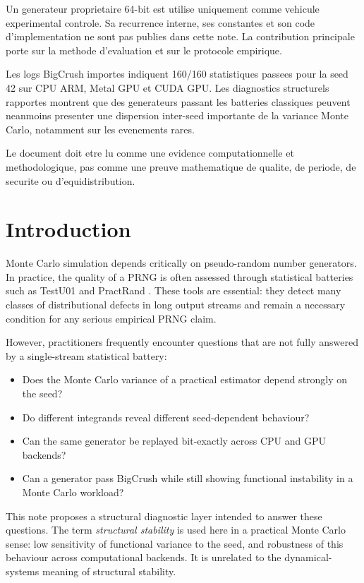 \documentclass[11pt,a4paper]{article}
\begin{document}
Un generateur proprietaire 64-bit est utilise uniquement comme vehicule experimental controle. Sa recurrence interne, ses constantes et son code d'implementation ne sont pas publies dans cette note. La contribution principale porte sur la methode d'evaluation et sur le protocole empirique.

Les logs BigCrush importes indiquent 160/160 statistiques passees pour la seed 42 sur CPU ARM, Metal GPU et CUDA GPU. Les diagnostics structurels rapportes montrent que des generateurs passant les batteries classiques peuvent neanmoins presenter une dispersion inter-seed importante de la variance Monte Carlo, notamment sur les evenements rares.

Le document doit etre lu comme une evidence computationnelle et methodologique, pas comme une preuve mathematique de qualite, de periode, de securite ou d'equidistribution.

\newpage
\tableofcontents
\newpage

\section{Introduction}

Monte Carlo simulation depends critically on pseudo-random number generators. In practice, the quality of a PRNG is often assessed through statistical batteries such as TestU01 \cite{lecuyer2007testu01} and PractRand \cite{practrand}. These tools are essential: they detect many classes of distributional defects in long output streams and remain a necessary condition for any serious empirical PRNG claim.

However, practitioners frequently encounter questions that are not fully answered by a single-stream statistical battery:

\begin{itemize}[nosep]
  \item Does the Monte Carlo variance of a practical estimator depend strongly on the seed?
  \item Do different integrands reveal different seed-dependent behaviour?
  \item Can the same generator be replayed bit-exactly across CPU and GPU backends?
  \item Can a generator pass BigCrush while still showing functional instability in a Monte Carlo workload?
\end{itemize}

This note proposes a structural diagnostic layer intended to answer these questions. The term \emph{structural stability} is used here in a practical Monte Carlo sense: low sensitivity of functional variance to the seed, and robustness of this behaviour across computational backends. It is unrelated to the dynamical-systems meaning of structural stability.
\end{document}
